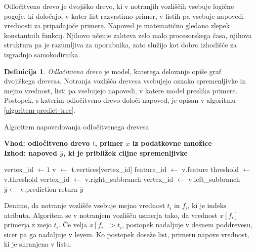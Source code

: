 \documentclass[12pt,a4paper,twoside]{article}
\theoremstyle{definition} %
\newtheorem{definicija}{Definicija}[section]
\theoremstyle{plain} %
\numberwithin{equation}{section}  %
\begin{document}
Odločitveno drevo je dvojiško drevo, ki v notranjih vozliščih vsebuje logične pogoje, ki določajo, v kater list razvrstimo primer, v listih pa vsebuje napovedi vrednosti za pripadajoče primere.
Napoved je matematično gledano zlepek konstantnih funkcij.
Njihovo učenje zahteva zelo malo procesorskega časa, njihova struktura pa je razumljiva za uporabnika, zato služijo kot dobro izhodišče za izgradnjo samokodirnika.


\begin{definicija} 
\label{def:odlocitveno-drevo}
\emph{Odločitveno drevo} je model, katerega delovanje opiše graf dvojiškega drevesa. 
Notranja vozlišča drevesa vsebujejo oznako spremenljivke in mejno vrednost, listi pa vsebujejo napovedi, v katere model preslika primere. 
Postopek, s katerim odločitveno drevo določi napoved, je opisan v algoritmu \ref{algoritem-predict-tree}.
% 
\begin{algorithm}[ht]
  \caption{Algoritem napovedovanja odločitvenega drevesa}
  \label{algoritem-predict-tree}
  \raggedright
  \textbf{Vhod: odločitveno drevo $t$, primer $x$ iz podatkovne množice}  \\
  \textbf{Izhod: napoved $\hat{y}$, ki je približek ciljne spremenljivke} 
  \begin{algorithmic}[0]
	\State vertex\_id $\gets 1$
		\State v $\gets$ t.vertices[vertex\_id]
		\State feature\_id $\gets$ v.feature
		\State threshold $\gets$ v.threshold
			\State vertex\_id $\gets$ v.right\_subbranch
		\Else
			\State vertex\_id $\gets$ v.left\_subbranch
		\EndIf
	\EndWhile
	\State $\hat{y} \gets$ v.prediction
	\State return $\hat{y}$
  \end{algorithmic}
\end{algorithm}
%
Denimo, da notranje vozlišče vsebuje mejno vrednost $t_i$ in $f_i$, ki je indeks atributa.
Algoritem se v notranjem vozlišču usmerja tako, da vrednost $x[f_i]$ primerja z mejo $t_i$.
Če velja $x[f_i] > t_i$, postopek nadaljuje v desnem poddrevesu, sicer pa ga nadaljuje v levem.
Ko postopek doseže list, primeru napove vrednost, ki je shranjena v listu.
\end{definicija}
\end{document}
